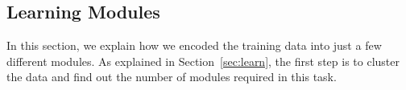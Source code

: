 






\subsection{Learning Modules}
\label{learning}

In this section, we explain how we encoded the training data into just
a few different modules. As explained in Section~\ref{sec:learn}, the
first step is to cluster the data and find out the number of modules
required in this task.


